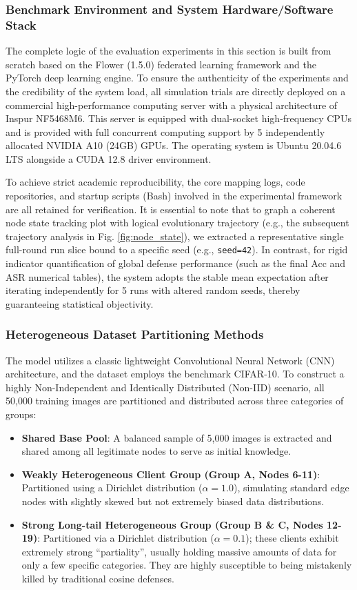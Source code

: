 \documentclass[runningheads]{llncs}
\begin{document}
\subsubsection{Benchmark Environment and System Hardware/Software Stack}
The complete logic of the evaluation experiments in this section is built from scratch based on the Flower (1.5.0) federated learning framework and the PyTorch deep learning engine. To ensure the authenticity of the experiments and the credibility of the system load, all simulation trials are directly deployed on a commercial high-performance computing server with a physical architecture of Inspur NF5468M6. This server is equipped with dual-socket high-frequency CPUs and is provided with full concurrent computing support by 5 independently allocated NVIDIA A10 (24GB) GPUs. The operating system is Ubuntu 20.04.6 LTS alongside a CUDA 12.8 driver environment.

To achieve strict academic reproducibility, the core mapping logs, code repositories, and startup scripts (Bash) involved in the experimental framework are all retained for verification. It is essential to note that to graph a coherent node state tracking plot with logical evolutionary trajectory (e.g., the subsequent trajectory analysis in Fig. \ref{fig:node_state}), we extracted a representative single full-round run slice bound to a specific seed (e.g., \texttt{seed=42}). In contrast, for rigid indicator quantification of global defense performance (such as the final Acc and ASR numerical tables), the system adopts the stable mean expectation after iterating independently for 5 runs with altered random seeds, thereby guaranteeing statistical objectivity.

\subsubsection{Heterogeneous Dataset Partitioning Methods}
The model utilizes a classic lightweight Convolutional Neural Network (CNN) architecture, and the dataset employs the benchmark CIFAR-10. To construct a highly Non-Independent and Identically Distributed (Non-IID) scenario, all 50,000 training images are partitioned and distributed across three categories of groups:
\begin{itemize}
    \item \textbf{Shared Base Pool}: A balanced sample of 5,000 images is extracted and shared among all legitimate nodes to serve as initial knowledge.
    \item \textbf{Weakly Heterogeneous Client Group (Group A, Nodes 6-11)}: Partitioned using a Dirichlet distribution ($\alpha=1.0$), simulating standard edge nodes with slightly skewed but not extremely biased data distributions.
    \item \textbf{Strong Long-tail Heterogeneous Group (Group B \& C, Nodes 12-19)}: Partitioned via a Dirichlet distribution ($\alpha=0.1$); these clients exhibit extremely strong ``partiality'', usually holding massive amounts of data for only a few specific categories. They are highly susceptible to being mistakenly killed by traditional cosine defenses.
\end{itemize}
\end{document}
